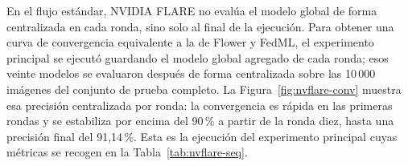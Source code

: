 \begin{table}[htbp]
  \centering
  \footnotesize
  \setlength{\tabcolsep}{4pt}
  \caption{Resultados de NVIDIA FLARE en modo secuencial. La RAM corresponde al proceso
  principal.}
  \label{tab:nvflare-seq}
\end{table}

En el flujo estándar, NVIDIA FLARE no evalúa el modelo global de forma centralizada en cada
ronda, sino solo al final de la ejecución. Para obtener una curva de convergencia equivalente a
la de Flower y FedML, el experimento principal se ejecutó guardando el modelo global agregado de
cada ronda; esos veinte modelos se evaluaron después de forma centralizada sobre las 10\,000
imágenes del conjunto de prueba completo. La Figura~\ref{fig:nvflare-conv} muestra esa precisión
centralizada por ronda: la convergencia es rápida en las primeras rondas y se estabiliza por
encima del 90\,\% a partir de la ronda diez, hasta una precisión final del 91{,}14\,\%. Esta es la
ejecución del experimento principal cuyas métricas se recogen en la Tabla~\ref{tab:nvflare-seq}.

